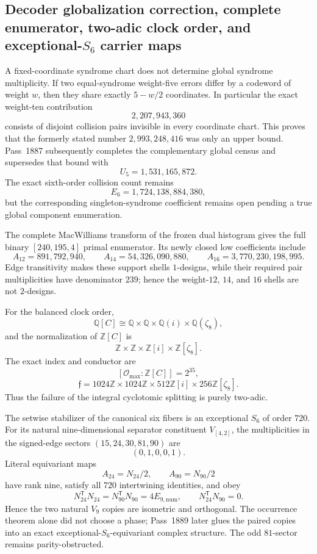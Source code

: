 \subsection{Decoder globalization correction, complete enumerator, two-adic clock order, and exceptional-$S_6$ carrier maps}
\label{subsec:bt1882-1886-five-frontiers}
A fixed-coordinate syndrome chart does not determine global syndrome multiplicity.  If two equal-syndrome weight-five errors differ by a codeword of weight $w$, then they share exactly $5-w/2$ coordinates.  In particular the exact weight-ten contribution
\[
 2{,}207{,}943{,}360
\]
consists of disjoint collision pairs invisible in every coordinate chart.  This proves that the formerly stated number $2{,}993{,}248{,}416$ was only an upper bound.  Pass~1887 subsequently completes the complementary global census and supersedes that bound with
\[
 \boxed{U_5=1{,}531{,}165{,}872}.
\]
The exact sixth-order collision count remains
\[
 E_6=1{,}724{,}138{,}884{,}380,
\]
but the corresponding singleton-syndrome coefficient remains open pending a true global component enumeration.

The complete MacWilliams transform of the frozen dual histogram gives the full binary $[240,195,4]$ primal enumerator.  Its newly closed low coefficients include
\[
 A_{12}=891{,}792{,}940,
 \qquad
 A_{14}=54{,}326{,}090{,}880,
 \qquad
 A_{16}=3{,}770{,}230{,}198{,}995.
\]
Edge transitivity makes these support shells $1$-designs, while their required pair multiplicities have denominator $239$; hence the weight-$12$, $14$, and $16$ shells are not $2$-designs.

For the balanced clock order,
\[
 \mathbb Q[C]\cong
 \mathbb Q\times\mathbb Q\times\mathbb Q(i)\times\mathbb Q(\zeta_8),
\]
and the normalization of $\mathbb Z[C]$ is
\[
 \mathbb Z\times\mathbb Z\times\mathbb Z[i]\times\mathbb Z[\zeta_8].
\]
The exact index and conductor are
\[
 [\mathcal O_{\max}:\mathbb Z[C]]=2^{35},
\]
\[
 \mathfrak f=
 1024\mathbb Z\times1024\mathbb Z\times512\mathbb Z[i]
 \times256\mathbb Z[\zeta_8].
\]
Thus the failure of the integral cyclotomic splitting is purely two-adic.

The setwise stabilizer of the canonical six fibers is an exceptional $S_6$ of order $720$.  For its natural nine-dimensional separator constituent $V_{[4,2]}$, the multiplicities in the signed-edge sectors $(15,24,30,81,90)$ are
\[
 \boxed{(0,1,0,0,1)}.
\]
Literal equivariant maps
\[
 A_{24}=N_{24}/2,
 \qquad
 A_{90}=N_{90}/2
\]
have rank nine, satisfy all $720$ intertwining identities, and obey
\[
 N_{24}^{\mathsf T}N_{24}=N_{90}^{\mathsf T}N_{90}=4E_{9,\mathrm{num}},
 \qquad
 N_{24}^{\mathsf T}N_{90}=0.
\]
Hence the two natural $V_9$ copies are isometric and orthogonal.  The occurrence theorem alone did not choose a phase; Pass~1889 later glues the paired copies into an exact exceptional-$S_6$-equivariant complex structure.  The odd $81$-sector remains parity-obstructed.

